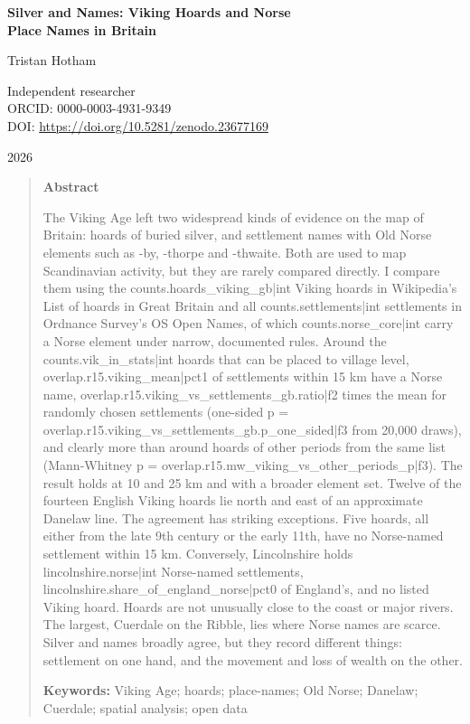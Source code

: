 \documentclass[11pt,a4paper]{article}
\begin{document}
\begin{center}
{\Large\bfseries Silver and Names: Viking Hoards and Norse\\[2pt] Place Names in Britain\par}
\vspace{1.2em}
{\large Tristan Hotham\par}
\vspace{0.3em}
{\small Independent researcher\\
ORCID: 0000-0003-4931-9349\\
DOI: \href{https://doi.org/10.5281/zenodo.23677169}{https://doi.org/10.5281/zenodo.23677169}\par}
\vspace{0.8em}
2026
\end{center}

\begin{quote}
\small
\begin{center}\textbf{Abstract}\end{center}
The Viking Age left two widespread kinds of evidence on the map of Britain: hoards of buried silver, and settlement names with Old Norse elements such as -by, -thorpe and -thwaite. Both are used to map Scandinavian activity, but they are rarely compared directly. I compare them using the {{counts.hoards_viking_gb|int}} Viking hoards in Wikipedia's List of hoards in Great Britain and all {{counts.settlements|int}} settlements in Ordnance Survey's OS Open Names, of which {{counts.norse_core|int}} carry a Norse element under narrow, documented rules. Around the {{counts.vik_in_stats|int}} hoards that can be placed to village level, {{overlap.r15.viking_mean|pct1}} of settlements within 15 km have a Norse name, {{overlap.r15.viking_vs_settlements_gb.ratio|f2}} times the mean for randomly chosen settlements (one-sided p = {{overlap.r15.viking_vs_settlements_gb.p_one_sided|f3}} from 20,000 draws), and clearly more than around hoards of other periods from the same list (Mann-Whitney p = {{overlap.r15.mw_viking_vs_other_periods_p|f3}}). The result holds at 10 and 25 km and with a broader element set. Twelve of the fourteen English Viking hoards lie north and east of an approximate Danelaw line. The agreement has striking exceptions. Five hoards, all either from the late 9th century or the early 11th, have no Norse-named settlement within 15 km. Conversely, Lincolnshire holds {{lincolnshire.norse|int}} Norse-named settlements, {{lincolnshire.share_of_england_norse|pct0}} of England's, and no listed Viking hoard. Hoards are not unusually close to the coast or major rivers. The largest, Cuerdale on the Ribble, lies where Norse names are scarce. Silver and names broadly agree, but they record different things: settlement on one hand, and the movement and loss of wealth on the other.

\textbf{Keywords:} Viking Age; hoards; place-names; Old Norse; Danelaw; Cuerdale; spatial analysis; open data
\end{quote}
\end{document}
